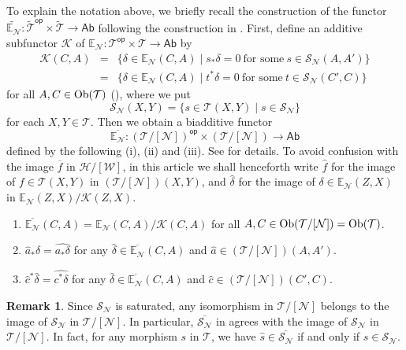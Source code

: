 \documentclass[a4paper,reqno,10pt]{amsart}
\theoremstyle{definition}
\theoremstyle{definition}
\newtheorem{remark}[remark]{Remark}
\theoremstyle{definition}
\theoremstyle{definition}
\theoremstyle{plain}
\def\Ab{\mathsf{Ab}}
\newcommand{\op}{\mathsf{op}}
\newcommand{\BE}{\mathbb{E}}
\newcommand{\CH}{\mathcal{H}}
\newcommand{\CK}{\mathcal{K}}
\newcommand{\CN}{\mathcal{N}}
\newcommand{\CT}{\mathcal{T}}
\newcommand{\CW}{\mathcal{W}}
\renewcommand{\SS}{\mathscr{S}}
\begin{document}
\color{blue}
To explain the notation above, we briefly recall the construction of the functor
$\widetilde{\BE_{\CN}}\colon\widetilde{\CT}^{\op}\times\widetilde{\CT}\to\Ab$
following the construction in \cite{NOS22}.
First, define an additive subfunctor
$\CK$ of $\BE_{\CN}\colon\CT^{\op}\times\CT\to\Ab$ by
\begin{eqnarray*}
\CK(C,A)
&=&
\{\delta\in\BE_{\CN}(C,A)\mid s_{\ast}\delta=0 \ \text{for some}\ s\in\SS_{\CN}(A,A')\}\\
&=&
\{\delta\in\BE_{\CN}(C,A)\mid t^{\ast}\delta=0 \ \text{for some}\ t\in\SS_{\CN}(C',C)\}
\end{eqnarray*}
for all $A,C\in\Ob(\CT)$ (\cite[Definition~3.14 and Proposition~3.15]{NOS22}),
where we put
\[
\SS_{\CN}(X,Y)
=
\{s\in\CT(X,Y)\mid s\in\SS_{\CN}\}
\]
for each $X,Y\in\CT$. Then we obtain a biadditive functor
\[ \overline{\BE_{\CN}}\colon(\CT/[\CN])^{\op}\times(\CT/[\CN])\to\Ab \]
defined by the following {\rm (i)}, {\rm (ii)} and {\rm (iii)}. See \cite[Definition~3.16]{NOS22} for details. To avoid confusion with the image $\overline{f}$ in $\CH/[\CW]$, in this article we shall henceforth write $\widehat{f}$ for the image of $f\in\CT(X,Y)$ in $(\CT/[\CN])(X,Y)$, and $\widehat{\delta}$ for the image of $\delta\in\BE_{\CN}(Z,X)$ in $\BE_{\CN}(Z,X)/\CK(Z,X)$.
\begin{enumerate}
\renewcommand{\labelenumi}{(\roman{enumi})}
\item $\overline{\BE_{\CN}}(C,A)=\BE_{\CN}(C,A)/\CK(C,A)$ for all $A,C\in\Ob(\CT/[\CN])=\Ob(\CT)$.
\item $\widehat{a}_{\ast}\widehat{\delta}=\widehat{a_{\ast}\delta}$ for any $\widehat{\delta}\in\overline{\BE_{\CN}}(C,A)$ and $\widehat{a}\in(\CT/[\CN])(A,A')$.
\item $\widehat{c}^{\ast}\widehat{\delta}=\widehat{c^{\ast}\delta}$ for any $\widehat{\delta}\in\overline{\BE_{\CN}}(C,A)$ and $\widehat{c}\in(\CT/[\CN])(C',C)$.
\end{enumerate}


\begin{remark}
Since $\SS_{\CN}$ is saturated, any isomorphism in $\CT/[\CN]$ belongs to the image of $\SS_{\CN}$ in $\CT/[\CN]$. In particular, $\overline{\SS_{\CN}}$ in \cite{NOS22} agrees with the image of $\SS_{\CN}$ in $\CT/[\CN]$. In fact, for any morphism $s$ in $\CT$, we have $\widehat{s}\in\overline{\SS_{\CN}}$ if and only if $s\in\SS_{\CN}$.
\end{remark}
\end{document}
